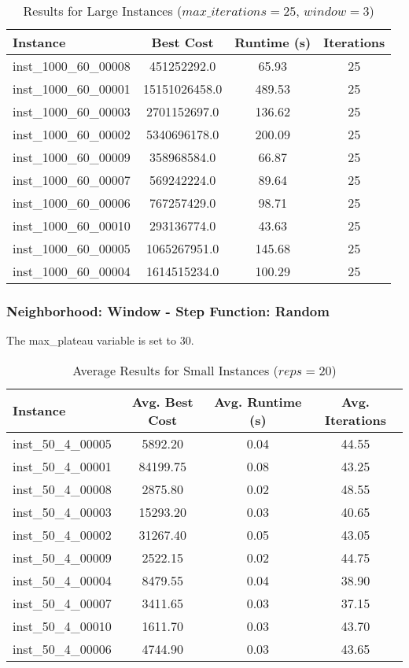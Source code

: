 \documentclass{article}
\begin{document}
\begin{table}[H]
\centering
\caption{Results for Large Instances ($max\_iterations = 25$, $window = 3$)}
\begin{tabular}{lccc}
\toprule
\textbf{Instance} & \textbf{Best Cost} & \textbf{Runtime (s)} & \textbf{Iterations} \\
\midrule
inst\_1000\_60\_00008 & 451252292.0   & 65.93  & 25 \\
inst\_1000\_60\_00001 & 15151026458.0 & 489.53 & 25 \\
inst\_1000\_60\_00003 & 2701152697.0  & 136.62 & 25 \\
inst\_1000\_60\_00002 & 5340696178.0  & 200.09 & 25 \\
inst\_1000\_60\_00009 & 358968584.0   & 66.87  & 25 \\
inst\_1000\_60\_00007 & 569242224.0   & 89.64  & 25 \\
inst\_1000\_60\_00006 & 767257429.0   & 98.71  & 25 \\
inst\_1000\_60\_00010 & 293136774.0   & 43.63  & 25 \\
inst\_1000\_60\_00005 & 1065267951.0  & 145.68 & 25 \\
inst\_1000\_60\_00004 & 1614515234.0  & 100.29 & 25 \\
\bottomrule
\end{tabular}
\label{tab:results_1000_60}
\end{table}

\subsubsection*{Neighborhood: Window - Step Function: Random}
The max\_plateau variable is set to 30.

\begin{table}[H]
\centering
\caption{Average Results for Small Instances ($reps = 20$)}
\begin{tabular}{lccc}
\toprule
\textbf{Instance} & \textbf{Avg. Best Cost} & \textbf{Avg. Runtime (s)} & \textbf{Avg. Iterations} \\
\midrule
inst\_50\_4\_00005 & 5892.20  & 0.04 & 44.55 \\
inst\_50\_4\_00001 & 84199.75 & 0.08 & 43.25 \\
inst\_50\_4\_00008 & 2875.80  & 0.02 & 48.55 \\
inst\_50\_4\_00003 & 15293.20 & 0.03 & 40.65 \\
inst\_50\_4\_00002 & 31267.40 & 0.05 & 43.05 \\
inst\_50\_4\_00009 & 2522.15  & 0.02 & 44.75 \\
inst\_50\_4\_00004 & 8479.55  & 0.04 & 38.90 \\
inst\_50\_4\_00007 & 3411.65  & 0.03 & 37.15 \\
inst\_50\_4\_00010 & 1611.70  & 0.03 & 43.70 \\
inst\_50\_4\_00006 & 4744.90  & 0.03 & 43.65 \\
\bottomrule
\end{tabular}
\label{tab:avg_results_50_4}
\end{table}
\end{document}
